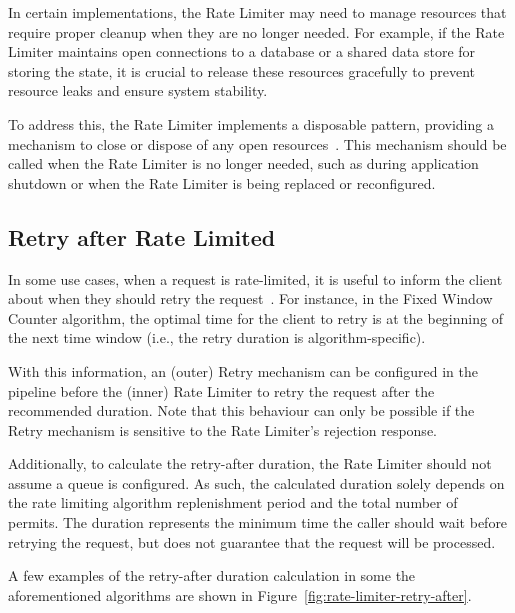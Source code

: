In certain implementations, the Rate Limiter may need to manage resources that require proper cleanup when they are no longer needed.
For example, if the Rate Limiter maintains open connections to a database or a shared data store
for storing the state, it is crucial to release these resources gracefully to prevent resource leaks and ensure system stability.

To address this, the Rate Limiter implements a disposable pattern,
providing a mechanism to close or dispose of any open resources~\cite{microsoft-dispose-pattern}.
This mechanism should be called when the Rate Limiter is no longer needed, such as during application shutdown or when the Rate Limiter is being replaced or reconfigured.

\subsection{Retry after Rate Limited}\label{subsec:rate-limiter-retry-after}

In some use cases, when a request is rate-limited, it is useful to inform the client about when they should retry the request~\cite{mdn-retry-after}.
For instance, in the Fixed Window Counter algorithm,
the optimal time for the client to retry is at the beginning of the next time window
(i.e., the retry duration is algorithm-specific).

With this information,
an (outer) Retry mechanism can be configured in the pipeline before the
(inner) Rate Limiter to retry the request after the recommended duration.
Note that this behaviour can only be possible
if the Retry mechanism is sensitive to the Rate Limiter's rejection response.

Additionally, to calculate the retry-after duration, the Rate Limiter should not assume a queue is configured.
As such,
the calculated duration solely depends on the rate limiting algorithm replenishment period and the total number of permits.
The duration represents the minimum time the caller should wait before retrying the request, but does not guarantee that the request will be processed.

A few examples of the retry-after duration calculation in some the aforementioned algorithms are shown in Figure~\ref{fig:rate-limiter-retry-after}.


